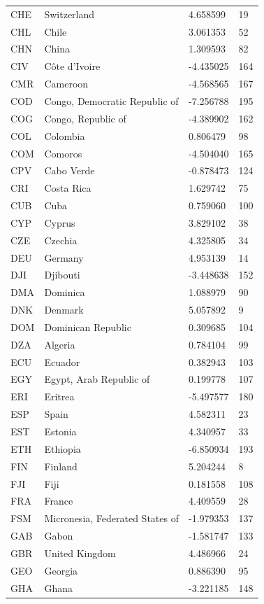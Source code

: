 \begin{tabular}{llll}
CHE & Switzerland & 4.658599 & 19 \\
CHL & Chile & 3.061353 & 52 \\
CHN & China & 1.309593 & 82 \\
CIV & Côte d'Ivoire & -4.435025 & 164 \\
CMR & Cameroon & -4.568565 & 167 \\
COD & Congo, Democratic Republic of & -7.256788 & 195 \\
COG & Congo, Republic of & -4.389902 & 162 \\
COL & Colombia & 0.806479 & 98 \\
COM & Comoros & -4.504040 & 165 \\
CPV & Cabo Verde & -0.878473 & 124 \\
CRI & Costa Rica & 1.629742 & 75 \\
CUB & Cuba & 0.759060 & 100 \\
CYP & Cyprus & 3.829102 & 38 \\
CZE & Czechia & 4.325805 & 34 \\
DEU & Germany & 4.953139 & 14 \\
DJI & Djibouti & -3.448638 & 152 \\
DMA & Dominica & 1.088979 & 90 \\
DNK & Denmark & 5.057892 & 9 \\
DOM & Dominican Republic & 0.309685 & 104 \\
DZA & Algeria & 0.784104 & 99 \\
ECU & Ecuador & 0.382943 & 103 \\
EGY & Egypt, Arab Republic of & 0.199778 & 107 \\
ERI & Eritrea & -5.497577 & 180 \\
ESP & Spain & 4.582311 & 23 \\
EST & Estonia & 4.340957 & 33 \\
ETH & Ethiopia & -6.850934 & 193 \\
FIN & Finland & 5.204244 & 8 \\
FJI & Fiji & 0.181558 & 108 \\
FRA & France & 4.409559 & 28 \\
FSM & Micronesia, Federated States of & -1.979353 & 137 \\
GAB & Gabon & -1.581747 & 133 \\
GBR & United Kingdom & 4.486966 & 24 \\
GEO & Georgia & 0.886390 & 95 \\
GHA & Ghana & -3.221185 & 148 \\

\end{tabular}
